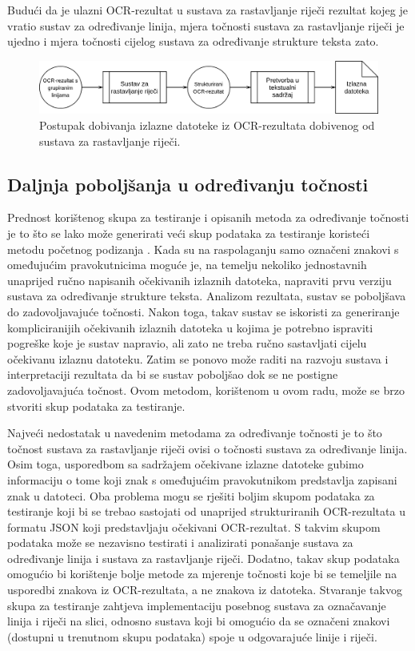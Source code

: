 \documentclass[times, utf8, zavrsni]{fer}
\begin{document}
Budući da je ulazni OCR-rezultat u sustava za rastavljanje riječi rezultat
kojeg je vratio sustav za određivanje linija, mjera točnosti sustava za
rastavljanje riječi je ujedno i mjera točnosti cijelog sustava za određivanje
strukture teksta zato.

\begin{figure}[htb]
    \centering
    \captionsetup{justification=centering,margin=2cm}
    \includegraphics[width=\textwidth]{images/sustav-05.png}
    \caption{
        Postupak dobivanja izlazne datoteke iz OCR-rezultata dobivenog od
        sustava za rastavljanje riječi.
    }
    \label{fig:sustav-05}
\end{figure}

\subsection{Daljnja poboljšanja u određivanju točnosti}
Prednost korištenog skupa za testiranje i opisanih metoda za određivanje
točnosti je to što se lako može generirati veći skup podataka za testiranje
koristeći metodu početnog podizanja . Kada su na
raspolaganju samo označeni znakovi s omeđujućim pravokutnicima moguće je, na
temelju nekoliko jednostavnih unaprijed ručno napisanih očekivanih izlaznih
datoteka, napraviti prvu verziju sustava za određivanje strukture teksta.
Analizom rezultata, sustav se poboljšava do zadovoljavajuće točnosti. Nakon
toga, takav sustav se iskoristi za generiranje kompliciranijih očekivanih
izlaznih datoteka u kojima je potrebno ispraviti pogreške koje je sustav
napravio, ali zato ne treba ručno sastavljati cijelu očekivanu izlaznu
datoteku. Zatim se ponovo može raditi na razvoju sustava i interpretaciji
rezultata da bi se sustav poboljšao dok se ne postigne zadovoljavajuća točnost.
Ovom metodom, korištenom u ovom radu, može se brzo stvoriti skup podataka za
testiranje.

Najveći nedostatak u navedenim metodama za određivanje točnosti je to što
točnost sustava za rastavljanje riječi ovisi o točnosti sustava za određivanje
linija. Osim toga, usporedbom sa sadržajem očekivane izlazne datoteke gubimo
informaciju o tome koji znak s omeđujućim pravokutnikom predstavlja zapisani
znak u datoteci. Oba problema mogu se rješiti boljim skupom podataka za
testiranje koji bi se trebao sastojati od unaprijed strukturiranih
OCR-rezultata u formatu JSON koji predstavljaju očekivani OCR-rezultat. S
takvim skupom podataka može se nezavisno testirati i analizirati ponašanje
sustava za određivanje linija i sustava za rastavljanje riječi. Dodatno, takav
skup podataka omogućio bi korištenje bolje metode za mjerenje točnosti koje bi
se temeljile na usporedbi znakova iz OCR-rezultata, a ne znakova iz datoteka.
Stvaranje takvog skupa za testiranje zahtjeva implementaciju posebnog sustava
za označavanje linija i riječi na slici, odnosno sustava koji bi omogućio da
se označeni znakovi (dostupni u trenutnom skupu podataka) spoje u odgovarajuće
linije i riječi.
\end{document}
